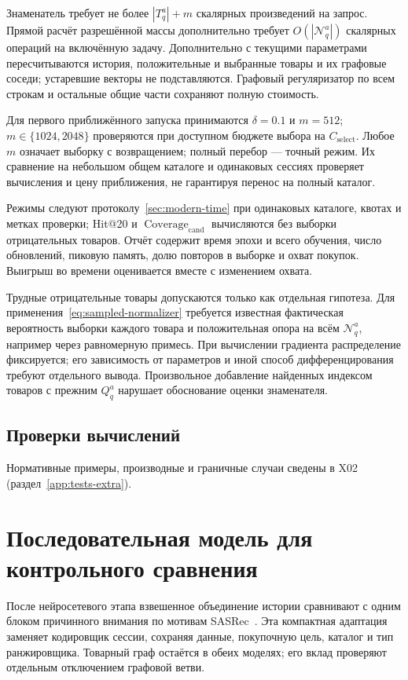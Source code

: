 \documentclass[12pt,a4paper]{article}
\theoremstyle{plainru}
\begin{document}
Знаменатель требует не более $|T_q^a|+m$ скалярных произведений на запрос.
Прямой расчёт разрешённой массы дополнительно требует
$O(|\mathcal N_q^a|)$ скалярных операций на включённую задачу.
Дополнительно с текущими параметрами пересчитываются история,
положительные и выбранные товары и их графовые соседи; устаревшие
векторы не подставляются. Графовый регуляризатор по всем строкам
и остальные общие части сохраняют полную стоимость.

Для первого приближённого запуска принимаются $\delta=0.1$ и $m=512$;
$m\in\{1024,2048\}$ проверяются при доступном бюджете выбора на $C_{\mathrm{select}}$.
Любое $m$ означает выборку с возвращением; полный перебор --- точный режим.
Их сравнение на небольшом общем каталоге и одинаковых сессиях проверяет
вычисления и цену приближения, не гарантируя перенос на полный каталог.

Режимы следуют протоколу~\ref{sec:modern-time} при одинаковых каталоге,
квотах и метках проверки; Hit@20 и $\operatorname{Coverage}_{\mathrm{cand}}$
вычисляются без выборки отрицательных товаров.
Отчёт содержит время эпохи и всего обучения, число обновлений,
пиковую память, долю повторов в выборке и охват покупок.
Выигрыш во времени оценивается вместе с изменением охвата.

Трудные отрицательные товары допускаются только как отдельная гипотеза.
Для применения~\eqref{eq:sampled-normalizer} требуется известная фактическая
вероятность выборки каждого товара и положительная опора на всём
$\mathcal N_q^a$, например через равномерную примесь. При вычислении
градиента распределение фиксируется; его зависимость от параметров
и иной способ дифференцирования требуют отдельного вывода.
Произвольное добавление найденных индексом товаров с прежним $Q_q^a$
нарушает обоснование оценки знаменателя.

\subsection{Проверки вычислений}
\label{sec:sampled-checks}

Нормативные примеры, производные и граничные случаи сведены
в X02 (раздел~\ref{app:tests-extra}).

\section{Последовательная модель для контрольного сравнения}
\label{sec:sequence-control}
\label{sec:sequence-overview}

После нейросетевого этапа взвешенное объединение истории сравнивают
с одним блоком причинного внимания по мотивам SASRec~\cite{sasrec2018}.
Эта компактная адаптация заменяет кодировщик сессии, сохраняя данные,
покупочную цель, каталог и тип ранжировщика. Товарный граф остаётся
в обеих моделях; его вклад проверяют отдельным отключением графовой ветви.
\end{document}
